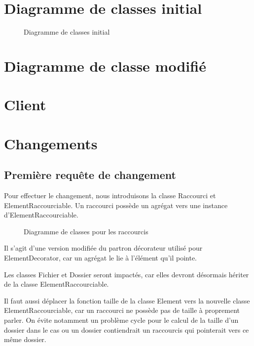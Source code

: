 \documentclass{article}
\begin{document}
  \section{Diagramme de classes initial}
  \begin{sidewaysfigure}
  \centering
  \resizebox{\textwidth}{!}{}
  \caption{Diagramme de classes initial}
  \end{sidewaysfigure}

  \section{Diagramme de classe modifié}

  \section{Client}

  \section{Changements}

  \subsection{Première requête de changement}
  Pour effectuer le changement, nous introduisons la classe \textsf{Raccourci}
  et \textsf{ElementRaccourciable}. Un raccourci possède un agrégat vers une
  instance d'\textsf{ElementRaccourciable}.

  \begin{sidewaysfigure}
  \centering
  \resizebox{\textwidth}{!}{}
  \caption{Diagramme de classes pour les raccourcis}
  \end{sidewaysfigure}

  Il s'agit d'une version modifiée du partron décorateur utilisé pour
  \textsf{ElementDecorator}, car un agrégat le lie à l'élément qu'il pointe.

  Les classes \textsf{Fichier} et \textsf{Dossier} seront impactés, car elles
  devront désormais hériter de la classe \textsf{ElementRaccourciable}.

  Il faut aussi déplacer la fonction \textsf{taille} de la classe
  \textsf{Element} vers la nouvelle classe \textsf{ElementRaccourciable}, car un
  raccourci ne possède pas de taille à proprement parler. On évite notamment un
  problème cycle pour le calcul de la taille d'un dossier dans le cas ou un
  dossier contiendrait un raccourcis qui pointerait vers ce même dossier.
\end{document}

